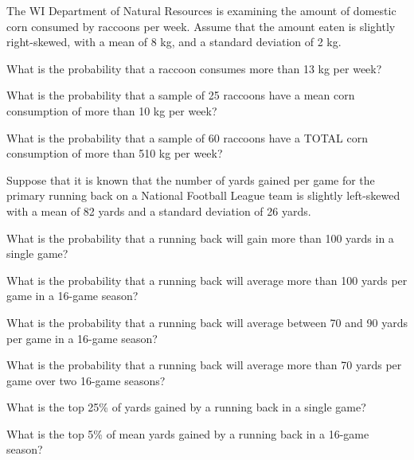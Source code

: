 \documentclass[10pt,openany]{book}\usepackage[]{graphicx}\usepackage[]{color}
\begin{document}
\begin{exsection}
  \begin{minipage}{\textwidth}
    \item \label{revex:CLTRocky} \rhw{} The WI Department of Natural Resources is examining the amount of domestic corn consumed by raccoons per week. Assume that the amount eaten is slightly right-skewed, with a mean of 8 kg, and a standard deviation of 2 kg. 
    \begin{Enumerate}
       \item What is the probability that a raccoon consumes more than 13 kg per week?
       \item What is the probability that a sample of 25 raccoons have a mean corn consumption of more than 10 kg per week?
       \item What is the probability that a sample of 60 raccoons have a TOTAL corn consumption of more than 510 kg per week?
    \end{Enumerate}
\end{minipage}

  \item \label{revex:CLTFootballRB} \rhw{} Suppose that it is known that the number of yards gained per game for the primary running  back on a National Football League team is slightly left-skewed with a mean of 82 yards and a standard deviation of 26 yards.
    \begin{Enumerate}
      \item What is the probability that a running back will gain more than 100 yards in a single game?
      \item What is the probability that a running back will average more than 100 yards per game in a 16-game season?
      \item What is the probability that a running back will average between 70 and 90 yards per game in a 16-game season?
      \item What is the probability that a running back will average more than 70 yards per game over two 16-game seasons?
      \item What is the top 25\% of yards gained by a running back in a single game?
      \item What is the top 5\% of mean yards gained by a running back in a 16-game season?
    \end{Enumerate}


\end{exsection}
\end{document}
